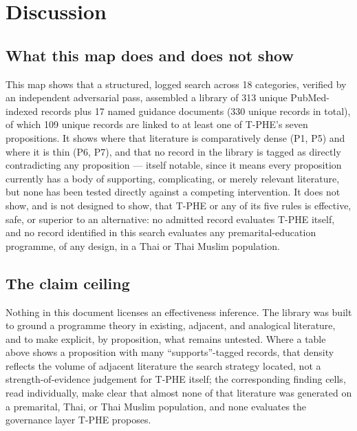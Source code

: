 \documentclass[11pt]{article}
\newcommand{\tphe}{T\mbox{-}PHE}
\begin{document}


\section{Discussion}

\subsection{What this map does and does not show}
This map shows that a structured, logged search across 18 categories, verified by an independent
adversarial pass, assembled a library of 313 unique PubMed-indexed records plus 17 named
guidance documents (330 unique records in total), of which 109 unique records are linked to at
least one of \tphe{}'s seven
propositions. It shows where that literature is comparatively dense (P1, P5) and where it is thin
(P6, P7), and that no record in the library is tagged as directly contradicting any proposition
--- itself notable, since it means every proposition currently has a body of supporting,
complicating, or merely relevant literature, but none has been tested directly against a
competing intervention. It does not show, and is not designed to show, that \tphe{} or any of its
five rules is effective, safe, or superior to an alternative: no admitted record evaluates \tphe{}
itself, and no record identified in this search evaluates any premarital-education programme, of
any design, in a Thai or Thai Muslim population.

\subsection{The claim ceiling}
Nothing in this document licenses an effectiveness inference. The library was built to ground a
programme theory in existing, adjacent, and analogical literature, and to make explicit, by
proposition, what remains untested. Where a table above shows a proposition with many
``supports''-tagged records, that density reflects the volume of adjacent literature the search
strategy located, not a strength-of-evidence judgement for \tphe{} itself; the corresponding
finding cells, read individually, make clear that almost none of that literature was generated on
a premarital, Thai, or Thai Muslim population, and none evaluates the governance layer \tphe{}
proposes.
\end{document}
